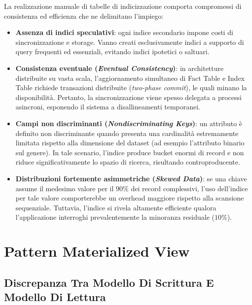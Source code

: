 \documentclass[11pt, a4paper]{article}
\begin{document}
La realizzazione manuale di tabelle di indicizzazione comporta compromessi di consistenza ed efficienza che ne delimitano l'impiego:
\begin{itemize}
    \item \textbf{Assenza di indici speculativi}: ogni indice secondario impone costi di sincronizzazione e storage. Vanno creati esclusivamente indici a supporto di query frequenti ed essenziali, evitando indici ipotetici o saltuari.
    \item \textbf{Consistenza eventuale (\emph{Eventual Consistency})}: in architetture distribuite su vasta scala, l'aggiornamento simultaneo di Fact Table e Index Table richiede transazioni distribuite (\emph{two-phase commit}), le quali minano la disponibilità. Pertanto, la sincronizzazione viene spesso delegata a processi asincroni, esponendo il sistema a disallineamenti temporanei.
    \item \textbf{Campi non discriminanti (\emph{Nondiscriminating Keys})}: un attributo è definito non discriminante quando presenta una cardinalità estremamente limitata rispetto alla dimensione del dataset (ad esempio l'attributo binario sul genere). In tale scenario, l'indice produce bucket enormi di record e non riduce significativamente lo spazio di ricerca, risultando controproducente.
    \item \textbf{Distribuzioni fortemente asimmetriche (\emph{Skewed Data})}: se una chiave assume il medesimo valore per il $90\%$ dei record complessivi, l'uso dell'indice per tale valore comporterebbe un overhead maggiore rispetto alla scansione sequenziale. Tuttavia, l'indice si rivela altamente efficiente qualora l'applicazione interroghi prevalentemente la minoranza residuale ($10\%$).
\end{itemize}

\newpage


\section{Pattern Materialized View}

\subsection{Discrepanza Tra Modello Di Scrittura E Modello Di Lettura}
\end{document}
